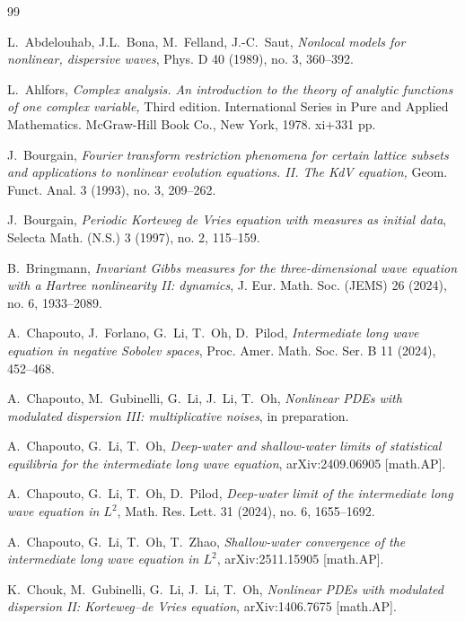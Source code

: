 \documentclass[letterpaper, 11pt,  reqno]{amsart}
\newcommand{\1}{\hspace{0.5mm}\textup{I}\hspace{0.5mm}}
\numberwithin{equation}{section}
\numberwithin{theorem}{section}
\begin{document}
\begin{thebibliography}{99}



L.~Abdelouhab, J.L.~Bona, M.~Felland, J.-C.~Saut,
{\it Nonlocal models for nonlinear, dispersive waves},
Phys. D 40 (1989), no. 3, 360--392.


L.~Ahlfors, 
{\it Complex analysis. An introduction to the theory of analytic functions of one complex variable,} Third edition. International Series in Pure and Applied Mathematics. McGraw-Hill Book Co., New York, 1978. xi+331 pp. 





J.~Bourgain, 
{\it Fourier transform restriction phenomena for certain lattice subsets and applications to
nonlinear evolution equations. II. The KdV equation,} 
 Geom. Funct. Anal. 3 (1993), no. 3, 209--262. 
	

J.~Bourgain, 
{\it Periodic Korteweg de Vries equation with measures as initial data},
 Selecta Math. (N.S.) 3 (1997), no. 2, 115--159. 

B.~Bringmann, 
{\it Invariant Gibbs measures for the three-dimensional wave equation with a Hartree nonlinearity II: dynamics}, J. Eur. Math. Soc. (JEMS) 26 (2024), no. 6, 1933--2089.

A.~Chapouto, J.~Forlano, G.~Li, T.~Oh, D.~Pilod,
{\it Intermediate long wave equation in negative Sobolev spaces},
Proc. Amer. Math. Soc. Ser. B 11 (2024), 452--468. 


A.~Chapouto, M.~Gubinelli, G.~Li, J.~Li, T.~Oh,
{\it Nonlinear PDEs with modulated dispersion III: 
multiplicative noises}, 
in preparation.



A.~Chapouto, G.~Li, T.~Oh, 
{\it Deep-water and shallow-water limits of statistical equilibria for the intermediate long wave equation}, 
arXiv:2409.06905 [math.AP].


A.~Chapouto, G.~Li, T.~Oh, D.~Pilod,
{\it Deep-water limit of the intermediate long wave equation in $L^2$}, 
Math. Res. Lett. 31 (2024), no. 6, 1655--1692. 

	

A.~Chapouto, G.~Li, T.~Oh, T.~Zhao, 
{\it 
Shallow-water convergence of the intermediate long wave equation in $L^2$}, 
arXiv:2511.15905 [math.AP].

K.~Chouk, M.~Gubinelli, G.~Li, J.~Li, T.~Oh,
{\it 
Nonlinear PDEs with modulated dispersion II: Korteweg--de Vries equation}, 
arXiv:1406.7675 [math.AP].





\end{thebibliography}
\end{document}
